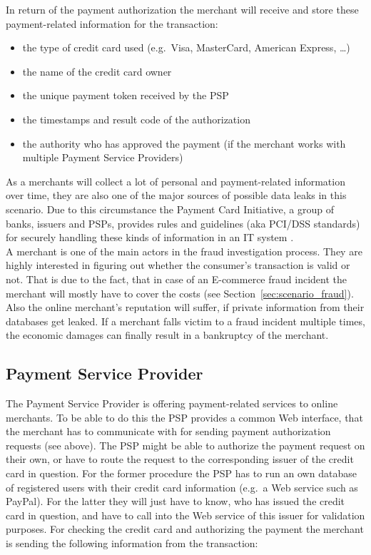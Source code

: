 In return of the payment authorization the merchant will receive and store these  payment-related information for the transaction:\@

\begin{itemize}
		\item the type of credit card used (e.g.\ Visa, MasterCard, American Express, \ldots)
		\item the name of the credit card owner
		\item the unique payment token received by the \gls{PSP}
		\item the timestamps and result code of the authorization
		\item the authority who has approved the payment (if the merchant works with multiple Payment Service Providers)
\end{itemize}

As a merchants will collect a lot of personal and payment-related information over time, they are also one of the major sources of possible data leaks in this scenario. Due to this circumstance the Payment Card Initiative, a group of banks, issuers and \gls{PSP}s, provides rules and guidelines (aka \gls{PCI/DSS} standards) for securely handling these kinds of information in an \gls{IT} system \citep{virtue2009payment}. \\

A merchant is one of the main actors in the fraud investigation process. They are highly interested in figuring out whether the consumer's transaction is valid or not. That is due to the fact, that in case of an \gls{E-commerce} fraud incident the merchant will mostly have to cover the costs (see Section~\ref{sec:scenario_fraud}). Also the online merchant's reputation will suffer, if private information from their databases get leaked. If a merchant falls victim to a fraud incident multiple times, the economic damages can finally result in a bankruptcy of the merchant.


\subsection{Payment Service Provider}
\label{subsec:stakeholder_psp}

The Payment Service Provider is offering payment-related services to online merchants. To be able to do this the \gls{PSP} provides a common Web interface, that the merchant has to communicate with for sending payment authorization requests (see above). The \gls{PSP} might be able to authorize the payment request on their own, or have to route the request to the corresponding issuer of the credit card in question. For the former procedure the \gls{PSP} has to run an own database of registered users with their credit card information (e.g.\ a Web service such as PayPal). For the latter they will just have to know, who has issued the credit card in question, and have to call into the Web service of this issuer for validation purposes. For checking the credit card and authorizing the payment the merchant is sending the following information from the transaction:\@

